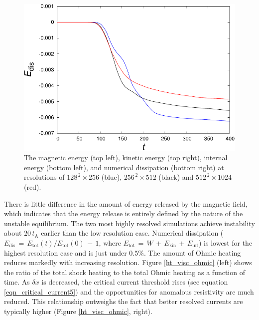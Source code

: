 \documentclass{./packages/rs/rsproca}
\begin{document}
\begin{figure}[h!]
  \includegraphics[scale=0.5]{./gnuplot/en_dis}
  \caption{\small{The magnetic energy (top left), kinetic energy (top right), internal energy (bottom left), and numerical dissipation (bottom right) at resolutions of $128^{\,2} \times 256$ (blue), $256^{\,2} \times 512$ (black) and $512^{\,2} \times 1024$ (red).}}
  \label{en}
\end{figure}
There is little difference in the amount of energy released by the magnetic field, which indicates that the energy release is entirely defined by the nature of the unstable equilibrium. The two most highly resolved simulations achieve instability about $20\,t_{\mathrm{A}}$ earlier than the low resolution case. Numerical dissipation ($E_{\mathrm{dis}}\,{=}\,E_{\mathrm{tot}}(t)/E_{\mathrm{tot}}(0)\,-\,1$, where $E_{\mathrm{tot}}\,=\,W\,+\,E_{\mathrm{kin}}\,+\,E_{\mathrm{int}}$) is lowest for the highest resolution case and is just under $0.5\%$. The amount of Ohmic heating reduces markedly with increasing resolution. Figure \ref{ht_visc_ohmic} (left) shows the ratio of the total shock heating to the total Ohmic heating as a function of time. As $\delta x$ is decreased, the critical current threshold rises (see equation \ref{eqn_critical_current5}) and the opportunities for anomalous resistivity are much reduced. This relationship outweighs the fact that better resolved currents are typically higher (Figure \ref{ht_visc_ohmic}, right).
\end{document}
